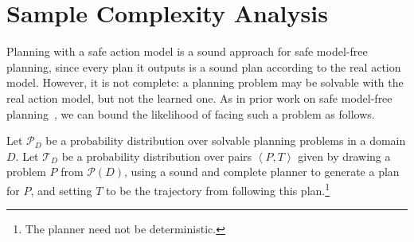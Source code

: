 \documentclass{article}
\newcommand{\tuple}[1]{\ensuremath{\left \langle #1 \right \rangle }}
\begin{document}
\section{Sample Complexity Analysis}

Planning with a safe action model is a sound approach for safe model-free planning, since every plan it outputs is a sound plan according to the real action model. 
However, it is not complete:
a planning problem may be solvable with the real action model, but not the learned one. %
As in prior work on safe model-free planning~\cite{stern2017efficientAndSafe}, we can bound the likelihood of facing such a problem %
as follows. 



Let $\mathcal{P}_D$ be a probability distribution over solvable planning problems in a domain $D$. 
Let $\mathcal{T}_D$ be a probability distribution over pairs $\tuple{P, T}$ 
given by drawing a problem $P$ from $\mathcal{P}(D)$, 
using a sound and complete planner to generate a plan for $P$, 
and setting $T$ to be the trajectory from following this plan.\footnote{%
The planner need not be deterministic.}


\end{document}

